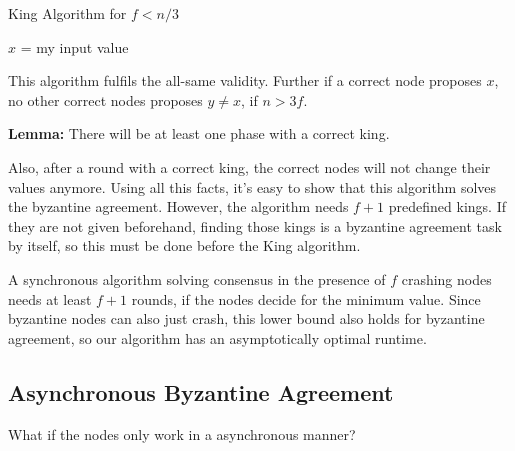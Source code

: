 \begin{algorithm}[H]
\caption{King Algorithm for $f < n / 3$}
	$x$ = my input value \\
\end{algorithm}
\medskip

This algorithm fulfils the all-same validity. Further if a correct node proposes $x$, no other correct nodes proposes $y \neq x$, if $n > 3f$. \medskip

\textbf{Lemma:} There will be at least one phase with a correct king. \medskip

Also, after a round with a correct king, the correct nodes will not change their values anymore. Using all this facts, it’s easy to show that this algorithm solves the byzantine agreement. However, the algorithm needs $f + 1$ predefined kings. If they are not given beforehand, finding those kings is a byzantine agreement task by itself, so this must be done before the King algorithm. \medskip

A synchronous algorithm solving consensus in the presence of $f$ crashing nodes needs at least $f + 1$ rounds, if the nodes decide for the minimum value. Since byzantine nodes can also just crash, this lower bound also holds for byzantine agreement, so our algorithm has an asymptotically optimal runtime.


\subsection{Asynchronous Byzantine Agreement}

What if the nodes only work in a asynchronous manner? \medskip

